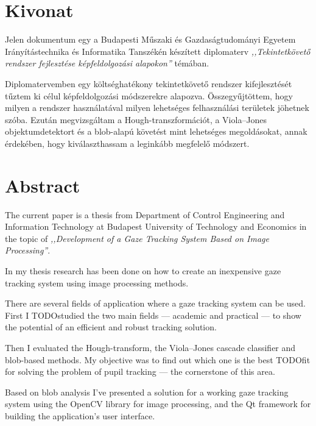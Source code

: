 \chapter*{Kivonat}

Jelen dokumentum egy a Budapesti Műszaki és Gazdaságtudományi Egyetem Irányítástechnika és Informatika Tanszékén készített diplomaterv \emph{,,Tekintetkövető rendszer fejlesztése képfeldolgozási alapokon''} témában. 

Diplomatervemben egy költséghatékony tekintetkövető rendszer kifejlesztését tűztem ki célul képfeldolgozási módszerekre alapozva. Összegyűjtöttem, hogy milyen a rendszer használatával milyen lehetséges felhasználási területek jöhetnek szóba. Ezután megvizsgáltam a Hough-transzformációt, a Viola--Jones objektumdetektort és a blob-alapú követést mint lehetséges megoldásokat, annak érdekében, hogy kiválaszthassam a leginkább megfelelő módszert.




\newpage

\chapter*{Abstract}

The current paper is a thesis from Department of Control Engineering and Information Technology at Budapest University of Technology and Economics in the topic of \emph{,,Development of a Gaze Tracking System Based on Image Processing''}. 

\bigskip

In my thesis research has been done on how to create an inexpensive gaze tracking system using image processing methods.

There are several fields of application where a gaze tracking system can be used. First I TODOstudied the two main fields --- academic and practical --- to show the potential of an efficient and robust tracking solution.

Then I evaluated the Hough-transform, the Viola--Jones cascade classifier and blob-based methods. My objective was to find out which one is the best TODOfit for solving the problem of pupil tracking --- the cornerstone of this area.

Based on blob analysis I've presented a solution for a working gaze tracking system using the OpenCV library for image processing, and the Qt framework for building the application's user interface. 

\vfill
